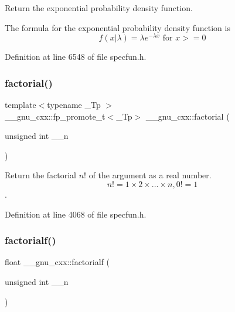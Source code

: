 Return the exponential probability density function. 

The formula for the exponential probability density function is \[ f(x|\lambda) = \lambda e^{-\lambda x} \mbox{ for } x >= 0 \] 

Definition at line 6548 of file specfun.\+h.

\mbox{\label{group__gnu__math__spec__func_ga963b1612f50b0964f5f42c9f289aab68}} 
\subsubsection{\texorpdfstring{factorial()}{factorial()}}
{\footnotesize\ttfamily template$<$typename \+\_\+\+Tp $>$ \\
\+\_\+\+\_\+gnu\+\_\+cxx\+::fp\+\_\+promote\+\_\+t$<$\+\_\+\+Tp$>$ \+\_\+\+\_\+gnu\+\_\+cxx\+::factorial (\begin{DoxyParamCaption}\item[{unsigned int}]{\+\_\+\+\_\+n }\end{DoxyParamCaption})\hspace{0.3cm}{\ttfamily [inline]}}



Return the factorial $ n! $ of the argument as a real number. \[ n! = 1 \times 2 \times ... \times n, 0! = 1 \]. 



Definition at line 4068 of file specfun.\+h.

\mbox{\label{group__gnu__math__spec__func_ga5a288283a8ed63e1d2b0145f313a5378}} 
\subsubsection{\texorpdfstring{factorialf()}{factorialf()}}
{\footnotesize\ttfamily float \+\_\+\+\_\+gnu\+\_\+cxx\+::factorialf (\begin{DoxyParamCaption}\item[{unsigned int}]{\+\_\+\+\_\+n }\end{DoxyParamCaption})\hspace{0.3cm}{\ttfamily [inline]}}

